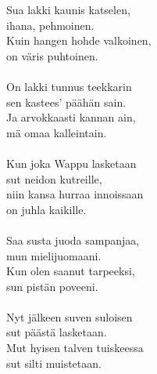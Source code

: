 
            Sua lakki kaunis katselen, \\
            ihana, pehmoinen. \\
            Kuin hangen hohde valkoinen, \\
            on väris puhtoinen. \\
\hspace{10mm} \\
            On lakki tunnus teekkarin \\
            sen kastees’ päähän sain. \\
            Ja arvokkaasti kannan ain, \\
            mä omaa kalleintain. \\
\hspace{10mm} \\
            Kun joka Wappu lasketaan \\
            sut neidon kutreille, \\
            niin kansa hurraa innoissaan \\
            on juhla kaikille. \\
\hspace{10mm} \\
            Saa susta juoda sampanjaa, \\
            mun mielijuomaani. \\
            Kun olen saanut tarpeeksi, \\
            sun pistän poveeni. \\
\hspace{10mm} \\
            Nyt jälkeen suven suloisen \\
            sut päästä lasketaan. \\
            Mut hyisen talven tuiskeessa \\
            sut silti muistetaan. \\
